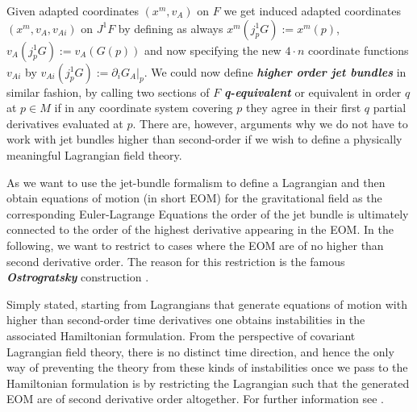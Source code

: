 \documentclass[a4paper,12pt, DIV=14, BCOR=5mm, twoside, headsepline, numbers=noenddot]{scrbook}
\begin{document}
Given adapted coordinates $(x^m,v_A)$ on $F$ we get induced adapted coordinates $(x^m, v_A, v_{Ai})$ on $J^1F$ by defining as always $x^m(j^1_pG) := x^m(p)$, $v_A(j^1_pG) := v_A(G(p))$ and now specifying the new $4 \cdot n$ coordinate functions $v_{Ai}$ by $v_{Ai}(j^1_pG) := \partial_iG_A \vert_p$.
We could now define \textit{\textbf{higher order jet bundles}} in similar fashion, by calling two sections of $F$ \textit{\textbf{q-equivalent}} or equivalent in order $q$ at $p \in M$ if in any coordinate system covering $p$ they agree in their first $q$ partial derivatives evaluated at $p$. There are, however, arguments why we do not have to work with jet bundles higher than second-order if we wish to define a physically meaningful Lagrangian field theory.

As we want to use the jet-bundle formalism to define a Lagrangian and then obtain equations of motion (in short EOM) for the gravitational field as the corresponding Euler-Lagrange Equations the order of the jet bundle is ultimately connected to the order of the highest derivative appearing in the EOM. In the following, we want to restrict to cases where the EOM are of no higher than second derivative order. The reason for this restriction is the famous \textbf{\textit{Ostrogratsky}} construction \cite{Ostrogradsky:1850fid}. 

Simply stated, starting from Lagrangians that generate equations of motion with higher than second-order time derivatives one obtains instabilities in the associated Hamiltonian formulation. From the perspective of covariant Lagrangian field theory, there is no distinct time direction, and hence the only way of preventing the theory from these kinds of instabilities once we pass to the Hamiltonian formulation is by restricting the Lagrangian such that the generated EOM are of second derivative order altogether. For further information see \cite{2015arXiv150602210W}. 
\end{document}
